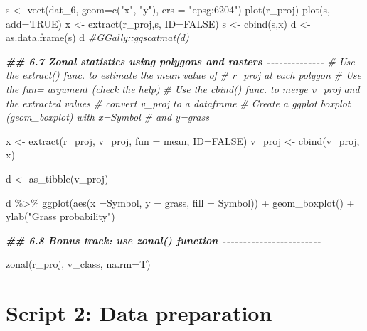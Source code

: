 \documentclass[
  10pt,
  b5paper,
  oneside]{book}
\newenvironment{Shaded}{\begin{snugshade}}{\end{snugshade}}
\newcommand{\AttributeTok}[1]{\textcolor[rgb]{0.77,0.63,0.00}{#1}}
\newcommand{\CommentTok}[1]{\textcolor[rgb]{0.56,0.35,0.01}{\textit{#1}}}
\newcommand{\ConstantTok}[1]{\textcolor[rgb]{0.00,0.00,0.00}{#1}}
\newcommand{\DocumentationTok}[1]{\textcolor[rgb]{0.56,0.35,0.01}{\textbf{\textit{#1}}}}
\newcommand{\FunctionTok}[1]{\textcolor[rgb]{0.00,0.00,0.00}{#1}}
\newcommand{\NormalTok}[1]{#1}
\newcommand{\OtherTok}[1]{\textcolor[rgb]{0.56,0.35,0.01}{#1}}
\newcommand{\SpecialCharTok}[1]{\textcolor[rgb]{0.00,0.00,0.00}{#1}}
\newcommand{\StringTok}[1]{\textcolor[rgb]{0.31,0.60,0.02}{#1}}
\begin{document}
\begin{Shaded}
\begin{Highlighting}[]
\NormalTok{s }\OtherTok{\textless{}{-}} \FunctionTok{vect}\NormalTok{(dat\_6, }\AttributeTok{geom=}\FunctionTok{c}\NormalTok{(}\StringTok{"x"}\NormalTok{, }\StringTok{"y"}\NormalTok{), }\AttributeTok{crs =} \StringTok{"epsg:6204"}\NormalTok{)}
\FunctionTok{plot}\NormalTok{(r\_proj)}
\FunctionTok{plot}\NormalTok{(s, }\AttributeTok{add=}\ConstantTok{TRUE}\NormalTok{)}
\NormalTok{x }\OtherTok{\textless{}{-}} \FunctionTok{extract}\NormalTok{(r\_proj,s, }\AttributeTok{ID=}\ConstantTok{FALSE}\NormalTok{)}
\NormalTok{s }\OtherTok{\textless{}{-}} \FunctionTok{cbind}\NormalTok{(s,x)}
\NormalTok{d }\OtherTok{\textless{}{-}} \FunctionTok{as.data.frame}\NormalTok{(s)}
\NormalTok{d}
\CommentTok{\#GGally::ggscatmat(d)}

\DocumentationTok{\#\# 6.7 Zonal statistics using polygons and rasters {-}{-}{-}{-}{-}{-}{-}{-}{-}{-}{-}{-}{-}{-}}
\CommentTok{\# Use the extract() func. to estimate the mean value of }
\CommentTok{\# r\_proj at each polygon}
\CommentTok{\# Use the fun= argument (check the help)}
\CommentTok{\# Use the cbind() func. to merge v\_proj and the extracted values}
\CommentTok{\# convert v\_proj to a dataframe}
\CommentTok{\# Create a ggplot boxplot (geom\_boxplot) with x=Symbol}
\CommentTok{\# and y=grass }

\NormalTok{x }\OtherTok{\textless{}{-}} \FunctionTok{extract}\NormalTok{(r\_proj, v\_proj, }\AttributeTok{fun =}\NormalTok{ mean, }\AttributeTok{ID=}\ConstantTok{FALSE}\NormalTok{)}
\NormalTok{v\_proj }\OtherTok{\textless{}{-}} \FunctionTok{cbind}\NormalTok{(v\_proj, x)}

\NormalTok{d }\OtherTok{\textless{}{-}} \FunctionTok{as\_tibble}\NormalTok{(v\_proj)}

\NormalTok{d }\SpecialCharTok{\%\textgreater{}\%} 
  \FunctionTok{ggplot}\NormalTok{(}\FunctionTok{aes}\NormalTok{(}\AttributeTok{x =}\NormalTok{Symbol, }\AttributeTok{y =}\NormalTok{ grass, }\AttributeTok{fill =}\NormalTok{ Symbol)) }\SpecialCharTok{+}
  \FunctionTok{geom\_boxplot}\NormalTok{() }\SpecialCharTok{+}
  \FunctionTok{ylab}\NormalTok{(}\StringTok{"Grass probability"}\NormalTok{)}

\DocumentationTok{\#\# 6.8 Bonus track: use zonal() function {-}{-}{-}{-}{-}{-}{-}{-}{-}{-}{-}{-}{-}{-}{-}{-}{-}{-}{-}{-}{-}{-}{-}{-}}

\FunctionTok{zonal}\NormalTok{(r\_proj, v\_class, }\AttributeTok{na.rm=}\NormalTok{T)}
\end{Highlighting}
\end{Shaded}

\hypertarget{script-2-data-preparation}{%
\section*{Script 2: Data preparation}\label{script-2-data-preparation}}
\end{document}
